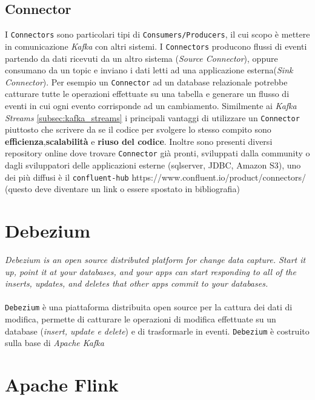 \subsection{Connector}
\label{subsec:kafka_connectors}
I \texttt{Connectors} sono particolari tipi di \texttt{Consumers/Producers}, il cui scopo è mettere in comunicazione \textit{Kafka} con altri sistemi.
I \texttt{Connectors} producono flussi di eventi partendo da dati ricevuti da un altro sistema (\textit{Source Connector}), oppure consumano da un topic e inviano i dati letti ad una applicazione esterna(\textit{Sink Connector}).
Per esempio un \texttt{Connector} ad un database relazionale potrebbe catturare tutte le operazioni effettuate su una tabella e generare un flusso di eventi in cui ogni evento corrisponde ad un cambiamento.
Similmente ai \textit{Kafka Streams} \ref{subsec:kafka_streams} i principali vantaggi di utilizzare un \texttt{Connector} piuttosto che scrivere da se il codice per svolgere lo stesso compito sono
\textbf{efficienza},\textbf{scalabilità} e \textbf{riuso del codice}.
Inoltre sono presenti diversi repository online dove trovare \texttt{Connector} già pronti, sviluppati dalla community o dagli sviluppatori delle applicazioni esterne (sqlserver, JDBC, Amazon S3),
uno dei più diffusi è il \texttt{confluent-hub} https://www.confluent.io/product/connectors/ \todo(questo deve diventare un link o essere spostato in bibliografia)

\section{Debezium}
\label{sec:debezium_overview}
\textit{Debezium is an open source distributed platform for change data capture. Start it up, point it at your databases, and your apps can start responding to all of the inserts, updates, and deletes that other apps commit to your databases.}\cite*{debeziumwebsite}\\\\
\texttt{Debezium} è una piattaforma distribuita open source per la cattura dei dati di modifica, permette di catturare le operazioni di modifica effettuate su un database (\textit{insert, update e delete}) e di trasformarle in eventi.
\texttt{Debezium} è costruito sulla base di \textit{Apache Kafka}
\section{Apache Flink}
\label{sec:flink_overview}
